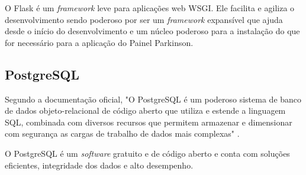 O Flask é um \textit{framework} leve para aplicações web WSGI. Ele facilita e agiliza o desenvolvimento sendo poderoso por ser um \textit{framework} expansível que ajuda desde o início do desenvolvimento e um núcleo poderoso para a instalação do que for necessário para a aplicação do Painel Parkinson\cite{grinberg2018flask}.

\subsection{PostgreSQL}
\label{sec:PostgreSQL}

Segundo a documentação oficial, "O PostgreSQL é um poderoso sistema de banco de dados objeto-relacional de código aberto que utiliza e estende a linguagem SQL, combinada com diversos recursos que permitem armazenar e dimensionar com segurança as cargas de trabalho de dados mais complexas" \cite{postgresql_about}.

O PostgreSQL é um \textit{software} gratuito e de código aberto e conta com soluções eficientes, integridade dos dados e alto desempenho.